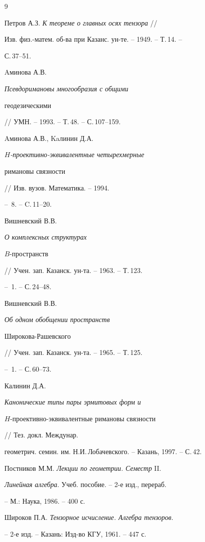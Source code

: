 \begin{thebibliography}{9}





 Петров А.З. {\em К теореме о главных осях тензора} //


Изв. физ.-матем. об-ва при Казанс. ун-те. -- 1949. -- Т.\,14. --


С.\,37--51.


 Aминова А.В. {\em Псевдоримановы многообразия с общими


геодезическими} // УМН. -- 1993. -- Т.\,48. -- С.\,107--159.


 Aминова А.В., Kaлинин Д.А.


{\em $H$-проективно-эквивалентные четырехмерные


римановы связности} // Изв. вузов. Математика. -- 1994.


-- \No\,8. -- C.\,11--20.


 Вишневский В.В. {\em О комплексных структурах


$B$-пространств} // Учен. зап. Казанск. ун-та. -- 1963. -- Т.\,123.


-- \No\,1. -- С.\,24--48.


 Вишневский В.В. {\em Об одном обобщении пространств


Широкова-Рашевского} // Учен. зап. Казанск. ун-та. -- 1965. -- Т.\,125.


-- \No\,1. -- С.\,60--73.


 Калинин Д.А. {\em Канонические типы пары эрмитовых форм и


$H$-проективно-эквивалентные римановы связности} // Тез. докл. Междунар.


геометрич. семин. им. Н.И.\,Лобачевского. -- Казань, 1997. -- С.\,42.


 Постников М.М. {\em Лекции по геометрии. Семестр} II.


{\em Линейная алгебра}. Учеб. пособие. -- 2-е изд., перераб.


-- М.: Наука, 1986. -- 400 с.


 Широков П.А. {\em Тензорное исчисление. Алгебра тензоров}.


-- 2-е изд. -- Казань: Изд-во КГУ, 1961. -- 447 с.





\end{thebibliography}





\vskip 2cm












\label{end}






